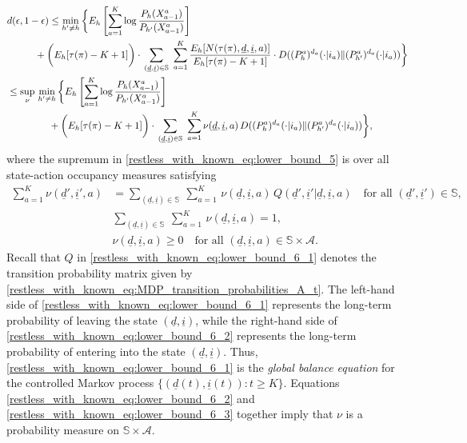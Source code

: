 \begingroup \allowdisplaybreaks\begin{align}
	&d(\epsilon,1-\epsilon)\leq \min\limits_{h'\neq h}\bigg\lbrace E_h\left[\sum\limits_{a=1}^{K} \log\frac{P_h(X_{a-1}^a)}{P_{h'}(X_{a-1}^a)}\right]\nonumber\\
	&\hspace{1cm}+ \bigg(E_h[\tau(\pi)-K+1]\bigg)\cdot\,\sum\limits_{(\underline{d},\underline{i})\in\mathbb{S}}~\sum\limits_{a=1}^{K}\frac{E_h[N(\tau(\pi),\underline{d},\underline{i},a)]}{E_h[\tau(\pi)-K+1]}\cdot D((P_h^a)^{d_a}(\cdot|i_a)\|(P_{h'}^a)^{d_a}(\cdot|i_a))\bigg\rbrace\nonumber\\
	&\leq \sup\limits_{\nu}\,\min\limits_{h'\neq h}\bigg\lbrace E_h\left[\sum\limits_{a=1}^{K} \log\frac{P_h(X_{a-1}^a)}{P_{h'}(X_{a-1}^a)}\right]\nonumber\\
	&\hspace{1.5cm}+\bigg(E_h[\tau(\pi)-K+1]\bigg)\cdot\,\sum\limits_{(\underline{d},\underline{i})\in\mathbb{S}}~\sum\limits_{a=1}^{K}\nu(\underline{d},\underline{i},a)\, D((P_h^a)^{d_a}(\cdot|i_a)\|(P_{h'}^a)^{d_a}(\cdot|i_a))\bigg\rbrace,\label{restless_with_known_eq:lower_bound_5}
	\end{align}\endgroup
where the supremum in \eqref{restless_with_known_eq:lower_bound_5} is over all state-action occupancy measures satisfying
\begin{align}
	\sum\limits_{a=1}^{K}\nu(\underline{d}',\underline{i}',a)&=\sum\limits_{(\underline{d},\underline{i})\in\mathbb{S}}~\sum\limits_{a=1}^{K}\,\nu(\underline{d},\underline{i},a)\,Q(\underline{d}',\underline{i}'|\underline{d},\underline{i},a)\quad \text{for all }(\underline{d}',\underline{i}')\in\mathbb{S},\label{restless_with_known_eq:lower_bound_6_1}\\
	&\sum\limits_{(\underline{d},\underline{i})\in\mathbb{S}}~\sum\limits_{a=1}^{K}\,\nu(\underline{d},\underline{i},a)=1,\label{restless_with_known_eq:lower_bound_6_2}\\
	&\nu(\underline{d},\underline{i},a)\geq 0\quad \text{for all }(\underline{d},\underline{i},a)\in\mathbb{S}\times\mathcal{A}.\label{restless_with_known_eq:lower_bound_6_3}
\end{align} 
Recall that $Q$ in \eqref{restless_with_known_eq:lower_bound_6_1} denotes the transition probability matrix given by \eqref{restless_with_known_eq:MDP_transition_probabilities_A_t}. The left-hand side of \eqref{restless_with_known_eq:lower_bound_6_1} represents the long-term probability of leaving the state $(\underline{d},\underline{i})$, while the right-hand side of \eqref{restless_with_known_eq:lower_bound_6_2} represents the long-term probability of entering into the state $(\underline{d},\underline{i})$. Thus, \eqref{restless_with_known_eq:lower_bound_6_1} is the \emph{global balance equation} for the controlled Markov process $\{(\underline{d}(t),\underline{i}(t)):t\geq K\}$. Equations \eqref{restless_with_known_eq:lower_bound_6_2} and \eqref{restless_with_known_eq:lower_bound_6_3} together imply that $\nu$ is a probability measure on $\mathbb{S}\times\mathcal{A}$.
 
